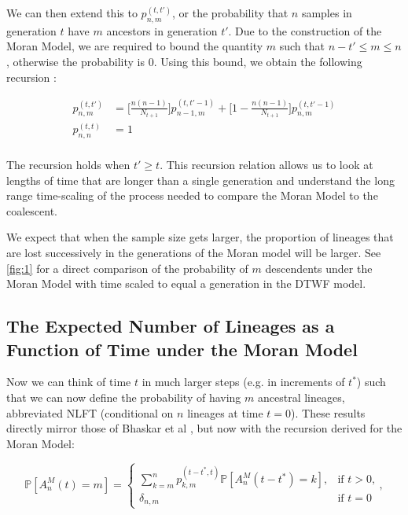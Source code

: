 \documentclass[10.5pt]{article}
\begin{document}
We can then extend this to $p^{(t, t')}_{n,m}$, or the probability that $n$ samples in generation $t$ have $m$  ancestors in generation $t'$. Due to the construction of the Moran Model, we are required to bound the quantity $m$ such that $n - t' \leq m \leq n$, otherwise the probability is $0$. Using this bound, we obtain the following recursion :

\begin{equation}
\begin{aligned}
	p^{(t, t')}_{n,m} &= \Bigg[\frac{n(n-1)}{N_{t+1}}\Bigg] p^{(t, t'-1)}_{n-1, m} + \Bigg[1 - \frac{n(n-1)}{N_{t+1}}\Bigg] p^{(t, t'-1)}_{n,m}\\
	p^{(t, t)}_{n,n} &= 1\\
\end{aligned}
\end{equation}

The recursion holds when $t' \geq t$. This recursion relation allows us to look at lengths of time that are longer than a single generation and understand the long range time-scaling of the process needed to compare the Moran Model to the coalescent.  

We expect that when the sample size gets larger, the proportion of lineages that are lost successively in the generations of the Moran model will be larger. See \ref{fig:1} for a direct comparison of the probability of $m$ descendents under the Moran Model with time scaled to equal a generation in the DTWF model. 

\subsection{The Expected Number of Lineages as a Function of Time under the Moran Model}

Now we can think of time $t$ in much larger steps (e.g. in increments of $t^*$) such that we can now define the probability of having $m$ ancestral lineages, abbreviated NLFT (conditional on $n$ lineages at time $t = 0$). These results directly mirror those of Bhaskar et al \citet{Bhaskar2014}, but now with the recursion derived for the Moran Model:

\begin{equation}
 \mathbb{P}[A^M_n(t) = m] =
 \begin{cases} 
	 \sum^n_{k=m}  p^{(t-t^*, t)}_{k,m} \mathbb{P}[A^M_n (t-t^*) = k],  &\text{if $t > 0$,}
 	 \\
	 \delta_{n,m} &\text{if $t = 0$}
 \end{cases},
\end{equation}
\end{document}
